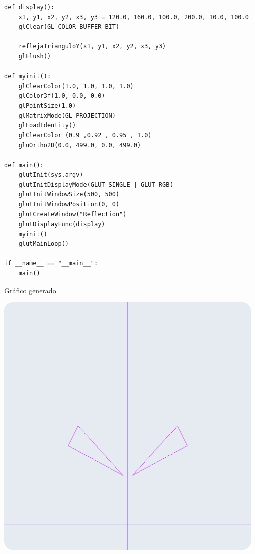 \documentclass[a4paper]{article}
\begin{document}
\begin{center}
\begin{mycodeboxl}
\begin{lstlisting}
def display():
    x1, y1, x2, y2, x3, y3 = 120.0, 160.0, 100.0, 200.0, 10.0, 100.0
    glClear(GL_COLOR_BUFFER_BIT)

    reflejaTrianguloY(x1, y1, x2, y2, x3, y3)
    glFlush()

def myinit():
    glClearColor(1.0, 1.0, 1.0, 1.0)
    glColor3f(1.0, 0.0, 0.0)
    glPointSize(1.0)
    glMatrixMode(GL_PROJECTION)
    glLoadIdentity()
    glClearColor (0.9 ,0.92 , 0.95 , 1.0)
    gluOrtho2D(0.0, 499.0, 0.0, 499.0)

def main():
    glutInit(sys.argv)
    glutInitDisplayMode(GLUT_SINGLE | GLUT_RGB)
    glutInitWindowSize(500, 500)
    glutInitWindowPosition(0, 0)
    glutCreateWindow("Reflection")
    glutDisplayFunc(display)
    myinit()
    glutMainLoop()

if __name__ == "__main__":
    main()
 \end{lstlisting}
\end{mycodeboxl}
\end{center}
\newpage
Gráfico generado\\
\begin{center}
\includegraphics[width=13cm]{src/3.png}
\end{center}
\end{document}
